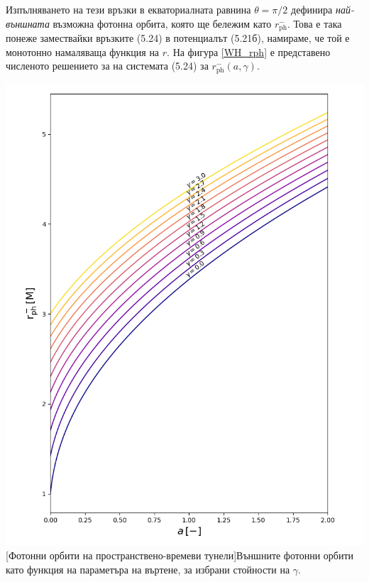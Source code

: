 	Изпълняването на тези връзки в екваториалната равнина $\theta = \pi / 2$ дефинира \emph{най-външната} възможна фотонна орбита, която ще бележим като $r_{\text{ph}}^-$. Това е така понеже замествайки връзките (5.24) в потенциалът (5.21б), намираме, че той е монотонно намаляваща функция на $r$. На фигура \ref{WH_rph} е представено численото решението за на системата (5.24) за $r^-_{\text{ph}}(a,\gamma)$. \\
	
	\noindent\begin{minipage}{14em}
		\hspace{-0.5cm}
		\includegraphics[scale = 0.35]{WH_rph.png}
		[Фотонни орбити на пространствено-времеви тунели]{\small Външните фотонни орбити като функция на параметъра на въртене, за избрани стойности на $\gamma$.}
		\label{WH_rph}
	\end{minipage}\,\,\,
